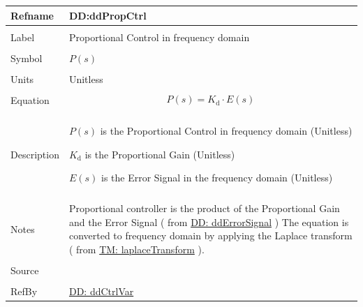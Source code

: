 \documentclass[12pt]{article}
\begin{document}
\vspace{\baselineskip}
\noindent
\begin{minipage}{\textwidth}
\begin{tabular}{>{\raggedright}p{}>{\raggedright\arraybackslash}p{}}
\toprule \textbf{Refname} & \textbf{DD:ddPropCtrl}
\label{DD:ddPropCtrl}
\\ \midrule \\
Label & Proportional Control in frequency domain
        
\\ \midrule \\
Symbol & $P(s)$
         
\\ \midrule \\
Units & Unitless
        
\\ \midrule \\
Equation & \begin{displaymath}
           P(s)={K_{\text{d}}}\cdot{}E(s)
           \end{displaymath}
\\ \midrule \\
Description & \begin{symbDescription}
              \item{$P(s)$ is the Proportional Control in frequency domain (Unitless)}
              \item{${K_{\text{d}}}$ is the Proportional Gain (Unitless)}
              \item{$E(s)$ is the Error Signal in the frequency domain (Unitless)}
              \end{symbDescription}
\\ \midrule \\
Notes & Proportional controller is the product of the Proportional Gain and the Error Signal ( from  \hyperref[DD:ddErrorSignal]{DD: ddErrorSignal} ) The equation is converted to frequency domain by applying the Laplace transform ( from \hyperref[TM:laplaceTransform]{TM: laplaceTransform} ).
        
\\ \midrule \\
Source & \cite{johnson2008}
         
\\ \midrule \\
RefBy & \hyperref[DD:ddCtrlVar]{DD: ddCtrlVar}
        
\\ \bottomrule
\end{tabular}
\end{minipage}
\end{document}
